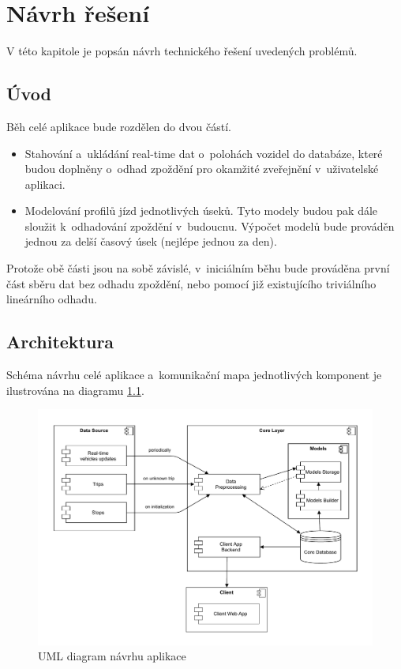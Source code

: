 

\chapter{Návrh řešení}


V této kapitole je popsán návrh technického řešení uvedených problémů.


\section{Úvod}


Běh celé aplikace bude rozdělen do dvou částí.


\begin{itemize}
\item Stahování a~ukládání real-time dat o~polohách vozidel do databáze, které budou doplněny o~odhad zpoždění pro okamžité zveřejnění v~uživatelské aplikaci.


\item Modelování profilů jízd jednotlivých úseků. Tyto modely budou pak dále sloužit k~odhadování zpoždění v~budoucnu. Výpočet modelů bude prováděn jednou za delší časový úsek (nejlépe jednou za den).
\end{itemize}


Protože obě části jsou na sobě závislé, v~iniciálním běhu bude prováděna první část sběru dat bez odhadu zpoždění, nebo pomocí již existujícího triviálního lineárního odhadu.

\section{Architektura}


Schéma návrhu celé aplikace a~komunikační mapa jednotlivých komponent je ilustrována na diagramu \ref{fig:design_diagram}.


\begin{figure}
\centering
  \includegraphics[width=\linewidth]{../img/design_diagram}
  \caption{UML diagram návrhu aplikace}
  \label{fig:design_diagram}
\end{figure}


